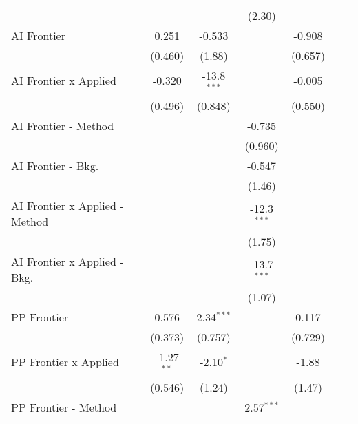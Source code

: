 \begin{tabular}{lcccccc}
                                  &              &               & (2.30)        &         &        &   \\   
   AI Frontier                    & 0.251        & -0.533        &               & -0.908  &        &   \\   
                                  & (0.460)      & (1.88)        &               & (0.657) &        &   \\   
   AI Frontier x Applied          & -0.320       & -13.8$^{***}$ &               & -0.005  &        &   \\   
                                  & (0.496)      & (0.848)       &               & (0.550) &        &   \\   
   AI Frontier - Method           &              &               & -0.735        &         &        &   \\   
                                  &              &               & (0.960)       &         &        &   \\   
   AI Frontier - Bkg.             &              &               & -0.547        &         &        &   \\   
                                  &              &               & (1.46)        &         &        &   \\   
   AI Frontier x Applied - Method &              &               & -12.3$^{***}$ &         &        &   \\   
                                  &              &               & (1.75)        &         &        &   \\   
   AI Frontier x Applied - Bkg.   &              &               & -13.7$^{***}$ &         &        &   \\   
                                  &              &               & (1.07)        &         &        &   \\   
   PP Frontier                    & 0.576        & 2.34$^{***}$  &               & 0.117   &        &   \\   
                                  & (0.373)      & (0.757)       &               & (0.729) &        &   \\   
   PP Frontier x Applied          & -1.27$^{**}$ & -2.10$^{*}$   &               & -1.88   &        &   \\   
                                  & (0.546)      & (1.24)        &               & (1.47)  &        &   \\   
   PP Frontier - Method           &              &               & 2.57$^{***}$  &         &        &   \\   

\end{tabular}
